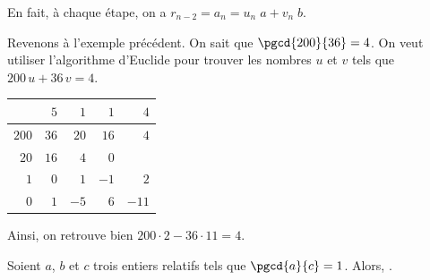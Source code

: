 		En fait, \`a chaque \'etape, on a
		$
			r_{n-2} = a_{n} = u_{n} \; a + v_{n} \; b
		$.
		
		\begin{ex}
		Revenons \`a l'exemple pr\'ec\'edent.%
		On sait que $\pgcd{200}{36} = 4$.
		On veut utiliser l'algorithme d'Euclide pour trouver les nombres $u$ et $v$ tels que 
		$200 \, u + 36 \, v = 4$.
		
			\begin{tabular}{|r|r|r|r|r|}			\hline
					& $5$	& $1$	& $1$	& $4$		\\ \hline
			$200$	& $36$	& $20$	& $16$	& $4$		\\ \hline
			$20$	& $16$	& $4$	& $0$	&			\\ \hline
			$1$		& $0$	& $1$	& $-1$	& $2$		\\ \hline
			$0$		& $1$	& $-5$	& $6$	& $-11$	\\ \hline
			\end{tabular}
		
		Ainsi, on retrouve bien $200 \cdot 2 - 36 \cdot 11 = 4$.
		\end{ex}
            \begin{thm}
                  Soient $a$, $b$ et $c$ trois entiers relatifs tels que $\pgcd{a}{c} = 1$.
                  Alors, .
            \end{thm}
